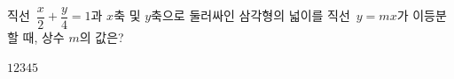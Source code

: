 직선~$\dfrac{x}{2}+\dfrac{y}{4}=1$과 $x$축 및 $y$축으로 둘러싸인 삼각형의 넓이를 직선~$y=mx$가 이등분할 때, 상수 $m$의 값은?
\begin{choices32}{$1$}{$2$}{$3$}{$4$}{$5$}\end{choices32}
